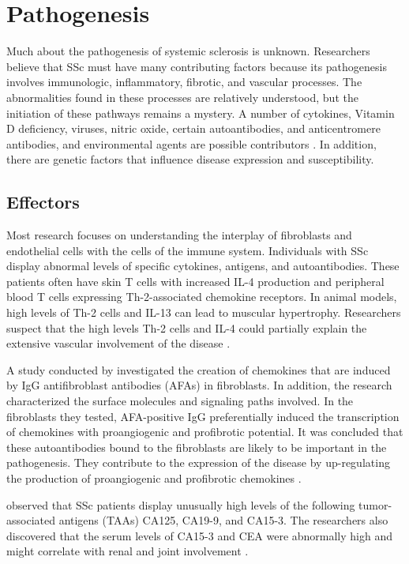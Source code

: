 \section{Pathogenesis}
\label{pathogenesis}

Much about the pathogenesis of systemic sclerosis is unknown. Researchers
believe that SSc must have many contributing factors because its pathogenesis
involves immunologic, inflammatory, fibrotic, and vascular processes. The
abnormalities found in these processes are relatively understood, but the
initiation of these pathways remains a mystery. A number of cytokines, Vitamin
D deficiency, viruses, nitric oxide, certain autoantibodies, and
anticentromere antibodies, and environmental agents are possible contributors
\citep{SscPath}. In addition, there are genetic factors that influence disease
expression and susceptibility. 

\subsection{Effectors}

Most research focuses on understanding the interplay of fibroblasts and
endothelial cells with the cells of the immune system. Individuals with SSc
display abnormal levels of specific cytokines, antigens, and autoantibodies.
These patients often have skin T cells with increased IL-4 production and
peripheral blood T cells expressing Th-2-associated chemokine receptors. In
animal models, high levels of Th-2 cells and IL-13 can lead to muscular
hypertrophy. Researchers suspect that the high levels Th-2 cells and IL-4
could partially explain the extensive vascular involvement of the disease
\citep{chizzolini}. 

A study conducted by \citeauthor{fineschi} investigated the creation of
chemokines that are induced by IgG antifibroblast antibodies (AFAs) in
fibroblasts. In addition, the research characterized the surface molecules and
signaling paths involved. In the fibroblasts they tested, AFA-positive IgG
preferentially induced the transcription of chemokines with proangiogenic and
profibrotic potential. It was concluded that these autoantibodies bound to the
fibroblasts are likely to be important in the pathogenesis. They contribute to
the expression of the disease by up-regulating the production of proangiogenic
and profibrotic chemokines \citep{chizzolini}.

\citeauthor{szekanecz} observed that SSc patients display unusually high
levels of the following tumor-associated antigens (TAAs) CA125, CA19-9, and
CA15-3. The researchers also discovered that the serum levels of CA15-3 and
CEA were abnormally high and might correlate with renal and joint involvement
\citep{szekanecz}.

